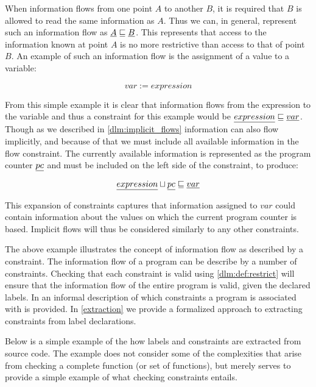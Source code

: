 When information flows from one point $A$ to another $B$, it is required that $B$ is allowed to read the same information as $A$.
Thus we can, in general, represent such an information flow as $\underline{A} \sqsubseteq \underline{B}$.
This represents that access to the information known at point $A$ is no more restrictive than access to that of point $B$.
An example of such an information flow is the assignment of a value to a variable:

$$var := expression$$

From this simple example it is clear that information flows from the expression to the variable and thus a constraint for this example would be $\underline{expression} \sqsubseteq \underline{var}$.
Though as we described in \cref{dlm:implicit_flows} information can also flow implicitly, and because of that we must include all available information in the flow constraint.
The currently available information is represented as the program counter $\underline{pc}$ and must be included on the left side of the constraint, to produce:

$$\underline{expression} \sqcup \underline{pc} \sqsubseteq \underline{var}$$

This expansion of constraints captures that information assigned to $var$ could contain information about the values on which the current program counter is based.
Implicit flows will thus be considered similarly to any other constraints.

The above example illustrates the concept of information flow as described by a constraint.
The information flow of a program can be describe by a number of constraints.
Checking that each constraint is valid using \cref{dlm:def:restrict} will ensure that the information flow of the entire program is valid, given the declared labels.
In \cite{myers1997, myers1998, myers2000} an informal description of which constraints a program is associated with is provided.
In \cref{extraction} we provide a formalized approach to extracting constraints from label declarations.

Below is a simple example of the how labels and constraints are extracted from source code.
The example does not consider some of the complexities that arise from checking a complete function (or set of functions), but merely serves to provide a simple example of what checking constraints entails.


